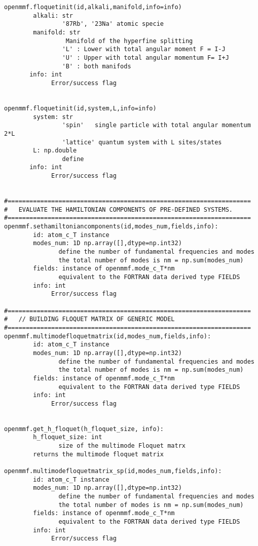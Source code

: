 \documentclass[10pt,a4paper]{article}
\begin{document}
\begin{verbatim}
openmmf.floquetinit(id,alkali,manifold,info=info)
        alkali: str
                '87Rb', '23Na' atomic specie
        manifold: str
                 Manifold of the hyperfine splitting
                'L' : Lower with total angular moment F = I-J
                'U' : Upper with total angular momentum F= I+J
                'B' : both manifods
       info: int
             Error/success flag
                

openmmf.floquetinit(id,system,L,info=info)
        system: str
                'spin'   single particle with total angular momentum 2*L
                'lattice' quantum system with L sites/states 
        L: np.double
                define
       info: int
             Error/success flag


#===================================================================
#   EVALUATE THE HAMILTONIAN COMPONENTS OF PRE-DEFINED SYSTEMS. 
#===================================================================
openmmf.sethamiltoniancomponents(id,modes_num,fields,info):
        id: atom_c_T instance
        modes_num: 1D np.array([],dtype=np.int32)
               define the number of fundamental frequencies and modes
               the total number of modes is nm = np.sum(modes_num)
        fields: instance of openmmf.mode_c_T*nm 
               equivalent to the FORTRAN data derived type FIELDS
        info: int
             Error/success flag
        
#===================================================================
#   // BUILDING FLOQUET MATRIX OF GENERIC MODEL
#===================================================================
openmmf.multimodefloquetmatrix(id,modes_num,fields,info):
        id: atom_c_T instance
        modes_num: 1D np.array([],dtype=np.int32)
               define the number of fundamental frequencies and modes
               the total number of modes is nm = np.sum(modes_num)
        fields: instance of openmmf.mode_c_T*nm 
               equivalent to the FORTRAN data derived type FIELDS
        info: int
             Error/success flag


openmmf.get_h_floquet(h_floquet_size, info):
        h_floquet_size: int
               size of the multimode Floquet matrx
        returns the multimode floquet matrix

openmmf.multimodefloquetmatrix_sp(id,modes_num,fields,info):
        id: atom_c_T instance
        modes_num: 1D np.array([],dtype=np.int32)
               define the number of fundamental frequencies and modes
               the total number of modes is nm = np.sum(modes_num)
        fields: instance of openmmf.mode_c_T*nm 
               equivalent to the FORTRAN data derived type FIELDS
        info: int
             Error/success flag


\end{verbatim}
\end{document}
